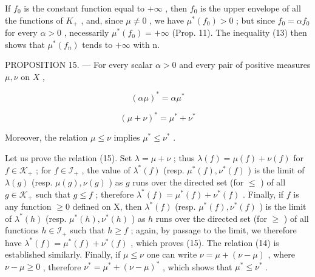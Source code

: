 If \(f_{0}\) is the constant function equal to \(+\infty\) , then \(f_{0}\) is the upper envelope of all the functions of \(K_{+}\) , and, since \(\mu \neq 0\) , we have \(\mu^{*}(f_{0}) > 0\) ; but since \(f_{0} = \alpha f_{0}\) for every \(\alpha > 0\) , necessarily \(\mu^{*}(f_{0}) = +\infty\) (Prop. 11). The inequality (13) then shows that \(\mu^{*}(f_{n})\) tends to \(+\infty\) with n.

PROPOSITION 15. --- For every scalar \(\alpha > 0\) and every pair of positive measures \(\mu, \nu\) on \(X\) ,

\[
(\alpha \mu) ^ {*} = \alpha \mu^ {*}\tag{14}
\]

\[
(\mu + \nu) ^ {*} = \mu^ {*} + \nu^ {*}\tag{15}
\]

Moreover, the relation \(\mu \leqslant \nu\) implies \(\mu^{*} \leqslant \nu^{*}\) .

Let us prove the relation (15). Set \(\lambda = \mu + \nu\) ; thus \(\lambda(f) = \mu(f) + \nu(f)\) for \(f \in \mathcal{K}_+\) ; for \(f \in \mathcal{I}_+\) , the value of \(\lambda^*(f)\) (resp. \(\mu^*(f), \nu^*(f)\) ) is the limit of \(\lambda(g)\) (resp. \(\mu(g), \nu(g)\) ) as \(g\) runs over the directed set (for \(\leqslant\) ) of all \(g \in \mathcal{K}_+\) such that \(g \leqslant f\) ; therefore \(\lambda^*(f) = \mu^*(f) + \nu^*(f)\) . Finally, if \(f\) is any function \(\geqslant 0\) defined on X, then \(\lambda^*(f)\) (resp. \(\mu^*(f), \nu^*(f)\) ) is the limit of \(\lambda^*(h)\) (resp. \(\mu^*(h), \nu^*(h)\) ) as \(h\) runs over the directed set (for \(\geqslant\) ) of all functions \(h \in \mathcal{I}_+\) such that \(h \geqslant f\) ; again, by passage to the limit, we therefore have \(\lambda^*(f) = \mu^*(f) + \nu^*(f)\) , which proves (15). The relation (14) is established similarly. Finally, if \(\mu \leqslant \nu\) one can write \(\nu = \mu + (\nu - \mu)\) , where \(\nu - \mu \geqslant 0\) , therefore \(\nu^* = \mu^* + (\nu - \mu)^*\) , which shows that \(\mu^* \leqslant \nu^*\) .

